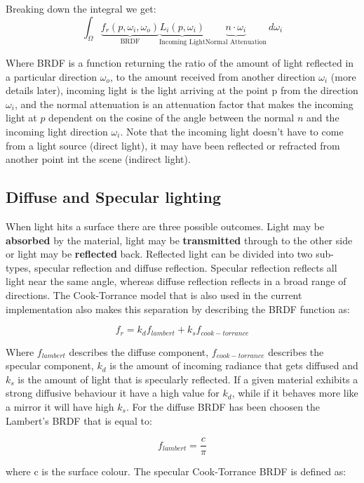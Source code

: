 Breaking down the integral we get:
\begin{equation}
\int_\Omega \underbrace{f_r(p,\omega_i,\omega_o)}_\text{BRDF}\underbrace{L_i(p,\omega_i)}_\text{Incoming Light}\underbrace{n\cdot\omega_i}_\text{Normal Attenuation}\ d\omega_i
\end{equation}

Where BRDF is a function returning the ratio of the amount of light reflected in a particular direction $\omega_o$, to the
amount received from another direction $\omega_i$ (more details later), incoming light is the light arriving at the point p
from the direction $\omega_i$, and the normal attenuation is an attenuation factor that makes the incoming light at $p$
dependent on the cosine of the angle between the normal $n$ and the incoming light direction $\omega_i$. Note that the
incoming light doesn't have to come from a light source (direct light), it may have been reflected or refracted from another
point int the scene (indirect light).

\subsection{Diffuse and Specular lighting}
When light hits a surface there are three possible outcomes. Light may be \textbf{absorbed} by the material, light may be
\textbf{transmitted} through to the other side or light may be \textbf{reflected} back.
Reflected light can be divided into two sub-types, specular reflection and diffuse reflection. Specular reflection reflects
all light near the same angle, whereas diffuse reflection reflects in a broad range of directions.
The Cook-Torrance model that is also used in the current implementation also makes this separation by describing the BRDF
function as:

$$f_r = k_d f_{lambert} + k_s f_{cook-torrance}$$

Where $f_{lambert}$ describes the diffuse component, $f_{cook-torrance}$ describes the specular component, $k_d$ is the amount
of incoming radiance that gets diffused and $k_s$ is the amount of light that is specularly reflected. If a given material
exhibits a strong diffusive behaviour it have a high value for $k_d$, while if it behaves more like a mirror it will have high $k_s$.
For the diffuse BRDF has been choosen the Lambert's BRDF that is equal to:

$$f_{lambert} = \frac{c}{\pi}$$

where c is the surface colour. The specular Cook-Torrance BRDF is defined as:

